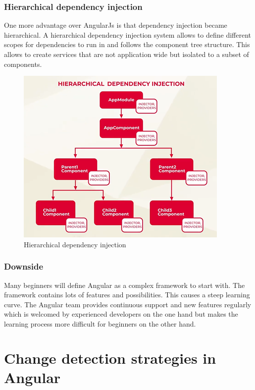 \subsubsection{Hierarchical dependency injection}
One more advantage over AngularJs is that dependency injection became hierarchical. A hierarchical dependency injection system allows to define different scopes for dependencies to run in and follows the component tree structure. This allows to create services that are not application wide but isolated to a subset of components.
\autocite{Rylan}
\begin{figure}[h!]
    \caption{Hierarchical dependency injection}
    \centering
    \includegraphics[width=\textwidth]{img/hieradi.png} 
\end{figure}

\subsubsection{Downside}
Many beginners will define Angular as a complex framework to start with. The framework contains lots of features and possibilities. This causes a steep learning curve. The Angular team provides continuous support and new features regularly which is welcomed by experienced developers on the one hand but makes the learning process more difficult for beginners on the other hand.
\autocite{AltexSoft}

\section{Change detection strategies in Angular}
